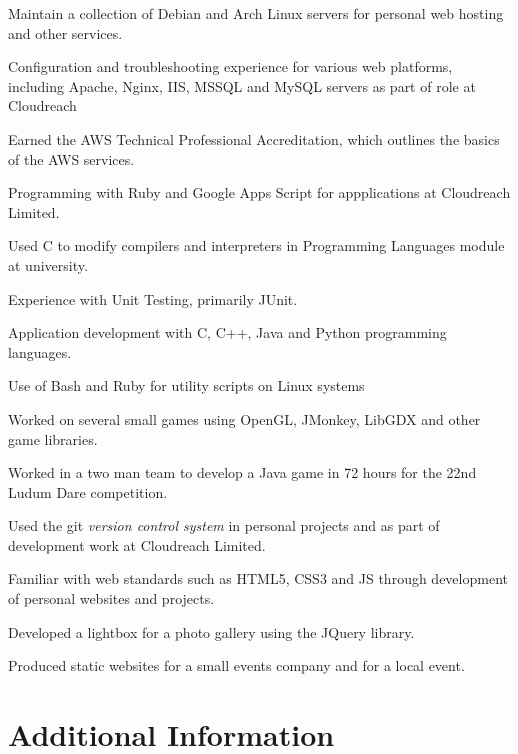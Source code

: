 \documentclass[11pt,a4paper]{article}
\renewenvironment{itemize}{
  \begin{list}{}{
    \setlength{\leftmargin}{1em}
    \setlength{\itemsep}{0.25em}
    \setlength{\parskip}{0pt}
    \setlength{\parsep}{0.25em}
    \renewcommand{\labelitemi}{$\bullet$}
  }
}{
  \end{list}
}
\begin{document}
\begin{itemize}
    \item Maintain a collection of Debian and Arch Linux servers for personal web hosting and other services.
    \item Configuration and troubleshooting experience for various web platforms, including Apache, Nginx, IIS, MSSQL and MySQL servers as part of role at Cloudreach
    \item Earned the AWS Technical Professional Accreditation, which outlines the basics of the AWS services.
    \item Programming with Ruby and Google Apps Script for appplications at Cloudreach Limited.
    \item Used C to modify compilers and interpreters in Programming Languages module at university.
    \item Experience with Unit Testing, primarily JUnit.
    \item Application development with C, C++, Java and Python programming languages.
    \item Use of Bash and Ruby for utility scripts on Linux systems 
    \item Worked on several small games using OpenGL, JMonkey, LibGDX and other game libraries.
    \item Worked in a  two man team to develop a Java game in 72 hours for the
        22nd Ludum Dare competition.
    \item Used the git \emph{version control system} in personal projects and as part of development work at Cloudreach Limited.
    \item Familiar with web standards such as HTML5, CSS3 and JS through development of personal websites and projects.
    \item Developed a lightbox for a photo gallery using the JQuery library.
    \item Produced static websites for a small events company and for a local event.
\end{itemize}

\section*{Additional Information}
\end{document}
